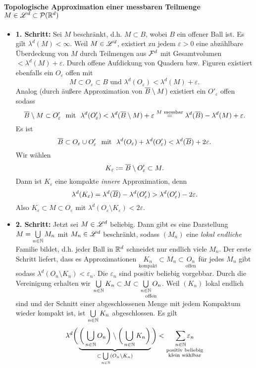\paragraph{Topologische Approximation einer messbaren Teilmenge $M\in \mathscr{L}^d \subset \mathcal{P}(\mathbb{R}^d)$}
\begin{itemize}
\item \textbf{1. Schritt:} Sei $M$ beschränkt, d.h. $M\subset B$, wobei $B$ ein offener Ball ist. Es gilt $\lambda^d(M)<\infty$. Weil $M \in \mathscr{L}^d$, existiert zu jedem $\varepsilon>0$ eine abzählbare Überdeckung von $M$ durch Teilmengen aus $\mathcal{F}^d$ mit Gesamtvolumen $< \lambda^d(M) +\varepsilon$. Durch offene Aufdickung von Quadern bzw. Figuren existiert ebenfalls ein $O_\varepsilon$ offen mit $$M \subset O_{\varepsilon} \subset B \text{\ \  und \ } \lambda^d(O_\varepsilon) < \lambda^d(M)+\varepsilon.$$ 
Analog (durch äußere Approximation von $\overline{B}\setminus M$) existiert ein $O'_\varepsilon$ offen sodass $$\overline{B}\setminus M\subset O'_\varepsilon \text{\ \  mit \ } \lambda^d(O'_\varepsilon)<\lambda^d(\overline{B}\setminus M)+\varepsilon\overset{M \text{ messbar}}= \lambda^d(\overline{B})-\lambda^d(M)+\varepsilon.$$ 
Es ist $$\overline{B}\subset O_\varepsilon \cup O'_\varepsilon \text{\ \  mit \ } \lambda^d(O_\varepsilon)+\lambda^d(O'_\varepsilon)<\lambda^d(\overline{B})+2\varepsilon.$$
Wir wählen $$K_\varepsilon := \overline{B} \setminus O'_\varepsilon \subset M.$$ Dann ist $K_\varepsilon$ eine kompakte \emph{innere} Approximation, denn $$\lambda^d(K_\varepsilon)=\lambda^d(\overline{B})-\lambda^d(O'_\varepsilon)>\lambda^d(O'_\varepsilon)-2\varepsilon.$$
Also $K_\varepsilon \subset M \subset O_\varepsilon$ mit $\lambda^d(O_\varepsilon \setminus K_\varepsilon) <2\varepsilon$.
\item \textbf{2. Schritt:} Jetzt sei $M\in\mathscr{L}^d$ beliebig. Dann gibt es eine Darstellung $M=\bigcup\limits_{n\in \mathbb{N}}M_n$ mit $M_n \in \mathscr{L}^d$ beschränkt, sodass $(M_n)$ eine \emph{lokal endliche} Familie bildet, d.h. jeder Ball in $\mathbb{R}^d$ schneidet nur endlich viele $M_n$. Der erste Schritt liefert, dass es Approximationen $\underset{\text{kompakt}}{K_n} \subset M_n \subset \underset{\text{offen}}{O_n}$ für jedes $M_n$ gibt sodass $\lambda^d (O_n \setminus K_n) < \varepsilon_n$. Die $\varepsilon_n$ sind positiv beliebig vorgebbar. Durch die Vereinigung erhalten wir ${\bigcup\limits_{n \in \mathbb{N}} K_n} \subset M \subset \underset{\text{offen}}{\bigcup\limits_{n \in \mathbb{N}} O_n}$. Weil $(K_n)$ lokal endlich sind und der Schnitt einer abgeschlossenen Menge mit jedem Kompaktum wieder kompakt ist, ist $\bigcup\limits_{n\in \mathbb{N}} K_n$ abgeschlossen. Es gilt
$$
\lambda^d\bigg( \underbrace{\bigg(\bigcup_{n\in\mathbb{N}}O_n \bigg) \setminus \bigg( \bigcup_{n\in\mathbb{N}}K_n\bigg)}_{\subset \bigcup\limits_{n \in \mathbb{N}}(O_n \setminus K_n)}\bigg) < \underset{\substack{\text{positiv beliebig}\\\text{klein wählbar}}}{\sum_{n \in \mathbb{N}}\varepsilon_n}
$$
\end{itemize}

